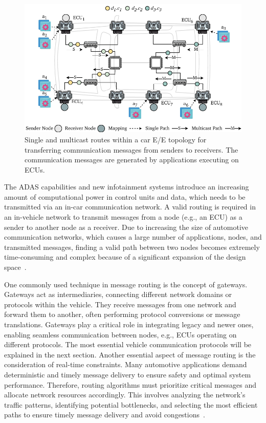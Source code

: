    \begin{figure}[t]
    \centering
    \includegraphics[width=1\textwidth]{figures/routing_basicCon.pdf}
    \caption{Single and multicast routes within a car E/E topology for transferring communication messages from senders to receivers. The communication messages are generated by applications executing on ECUs.}
    \label{fig23}
    \vspace{-8pt}
    \end{figure}
    The ADAS capabilities and new infotainment systems introduce an increasing amount of computational power in control units and data, which needs to be transmitted via an in-car communication network. A valid routing is required in an in-vehicle network to transmit messages from a node (e.g., an ECU) as a sender to another node as a receiver. Due to increasing the size of automotive communication networks, which causes a large number of applications, nodes, and transmitted messages, finding a valid path between two nodes becomes extremely time-consuming and complex because of a significant expansion of the design space~\cite{9565115,smirnov2017optimizing, askaripoor2023designer, 9613692}.
    
    
    One commonly used technique in message routing is the concept of gateways. Gateways act as intermediaries, connecting different network domains or protocols within the vehicle. They receive messages from one network and forward them to another, often performing protocol conversions or message translations. Gateways play a critical role in integrating legacy and newer ones, enabling seamless communication between nodes, e.g., ECUs operating on different protocols. The most essential vehicle communication protocols will be explained in the next section.
    Another essential aspect of message routing is the consideration of real-time constraints. Many automotive applications demand deterministic and timely message delivery to ensure safety and optimal system performance. Therefore, routing algorithms must prioritize critical messages and allocate network resources accordingly. This involves analyzing the network's traffic patterns, identifying potential bottlenecks, and selecting the most efficient paths to ensure timely message delivery and avoid congestions~\cite{askaripoor2023designer,9565115, smirnov2018automatic}.
 
